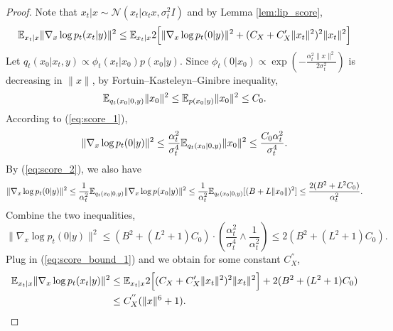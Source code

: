 \documentclass[11pt]{article}
\numberwithin{equation}{section}
\renewcommand{\eqref}[1]{(\ref{#1})}
\begin{document}
\begin{proof}
    Note that $x_t|x\sim \mathcal{N}(x_t|\alpha_tx,\sigma_t^2I)$ and by Lemma \ref{lem:lip_score},
    \begin{equation}\label{eq:score_bound_1}
        \mathbb{E}_{x_t|x}\|\nabla_x\log p_t(x_t|y)\|^2
        \leq \mathbb{E}_{x_t|x} 2\Big[\|\nabla_x\log p_t(0|y)\|^2+(C_X+C_X'\|x_t\|^2)^2\|x_t\|^2\Big]
    \end{equation}
    Let $q_t(x_0|x_t,y)\propto \phi_t(x_t|x_0)p(x_0|y)$.
    Since $\phi_t(0|x_0)\propto \exp\left(-\frac{\alpha_t^2\|x\|^2}{2\sigma_t^2}\right)$ is decreasing in $\|x\|$, by Fortuin–Kasteleyn–Ginibre inequality,
    \begin{equation}
        \mathbb{E}_{q_t(x_0|0,y)}\|x_0\|^2\leq \mathbb{E}_{p(x_0|y)}\|x_0\|^2\leq C_0.
    \end{equation}
    According to \eqref{eq:score_1},
    \begin{equation}
        \|\nabla_x\log p_t(0|y)\|^2
        \leq \frac{\alpha_t^2}{\sigma_t^4}\mathbb{E}_{q_t(x_0|0,y)}\|x_0\|^2\leq \frac{C_0\alpha_t^2}{\sigma_t^4}.
    \end{equation}
    By \eqref{eq:score_2}, we also have
    \begin{equation}
        \|\nabla_x\log p_t(0|y)\|^2
        \leq \frac{1}{\alpha_t^2}\mathbb{E}_{q_t(x_0|0,y)}\|\nabla_x\log p(x_0|y)\|^2\leq \frac{1}{\alpha_t^2}\mathbb{E}_{q_t(x_0|0,y)}[(B+L\|x_0\|)^2]\leq \frac{2(B^2+L^2C_0)}{\alpha_t^2}.
    \end{equation}
    Combine the two inequalities,
    \begin{equation}
        \|\nabla_x\log p_t(0|y)\|^2\leq (B^2+(L^2+1)C_0)\cdot(\frac{\alpha_t^2}{\sigma_t^4}\wedge\frac{1}{\alpha_t^2})\leq 2(B^2+(L^2+1)C_0).
    \end{equation}
    Plug in \eqref{eq:score_bound_1} and we obtain for some constant $C_X^{''}$,
    \begin{equation}
        \begin{aligned}
        \mathbb{E}_{x_t|x}\|\nabla_x\log p_t(x_t|y)\|^2
        &\leq \mathbb{E}_{x_t|x} 2\Big[(C_X+C_X'\|x_t\|^2)^2\|x_t\|^2\Big] + 2(B^2+(L^2+1)C_0) \\
        &\leq C_X^{''}(\|x\|^6+1).
        \end{aligned}
    \end{equation}
\end{proof}
\end{document}
